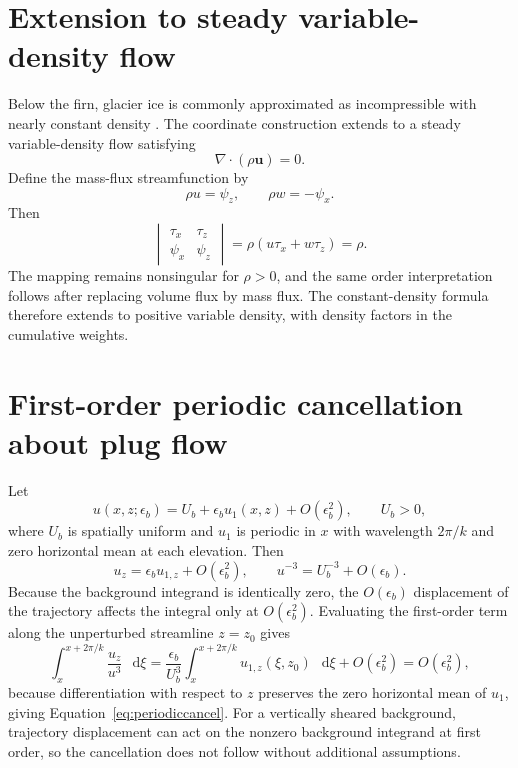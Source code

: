 \documentclass[review]{igs}
\begin{document}
\section{Extension to steady variable-density flow}
\label{app:density}

Below the firn, glacier ice is commonly approximated as incompressible with nearly constant density \citep{lipovsky2022density}. The coordinate construction extends to a steady variable-density flow satisfying
\begin{equation}
\nabla\cdot(\rho\bm{u})=0.
\end{equation}
Define the mass-flux streamfunction by
\begin{equation}
\rho u=\psi_z,
\qquad
\rho w=-\psi_x.
\end{equation}
Then
\begin{equation}
\begin{vmatrix}
\tau_x & \tau_z \\
\psi_x & \psi_z
\end{vmatrix}
=\rho(u\tau_x+w\tau_z)=\rho.
\end{equation}
The mapping remains nonsingular for \(\rho>0\), and the same order interpretation follows after replacing volume flux by mass flux. The constant-density formula therefore extends to positive variable density, with density factors in the cumulative weights.

\section{First-order periodic cancellation about plug flow}
\label{app:periodic}

Let
\begin{equation}
 u(x,z;\epsilon_b)=U_b+\epsilon_b u_1(x,z)+O(\epsilon_b^2),
 \qquad U_b>0,
\end{equation}
where \(U_b\) is spatially uniform and \(u_1\) is periodic in \(x\) with wavelength \(2\pi/k\) and zero horizontal mean at each elevation. Then
\begin{equation}
 u_z=\epsilon_b u_{1,z}+O(\epsilon_b^2),
 \qquad
 u^{-3}=U_b^{-3}+O(\epsilon_b).
\end{equation}
Because the background integrand is identically zero, the \(O(\epsilon_b)\) displacement of the trajectory affects the integral only at \(O(\epsilon_b^2)\). Evaluating the first-order term along the unperturbed streamline \(z=z_0\) gives
\begin{equation}
\int_x^{x+2\pi/k}\frac{u_z}{u^3}\,\mathop{}\!\mathrm{d}\xi
=\frac{\epsilon_b}{U_b^3}
\int_x^{x+2\pi/k}u_{1,z}(\xi,z_0)\,\mathop{}\!\mathrm{d}\xi
+O(\epsilon_b^2)
=O(\epsilon_b^2),
\end{equation}
because differentiation with respect to \(z\) preserves the zero horizontal mean of \(u_1\), giving Equation~\ref{eq:periodiccancel}. For a vertically sheared background, trajectory displacement can act on the nonzero background integrand at first order, so the cancellation does not follow without additional assumptions.
\end{document}
